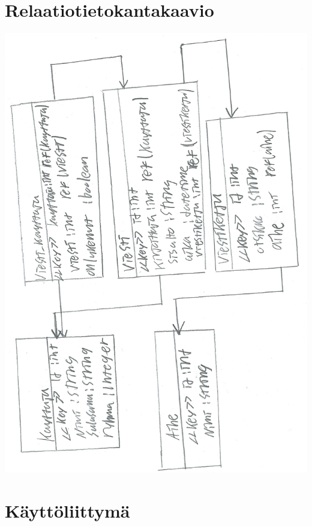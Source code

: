 \documentclass[a4paper, 12pt, finnish]{article}
\begin{document}
\section{Relaatiotietokantakaavio}
\includegraphics[width=\textwidth,height=\textheight,keepaspectratio]{relaatiotietokantakaavio.png}

\section{Käyttöliittymä}
\end{document}
